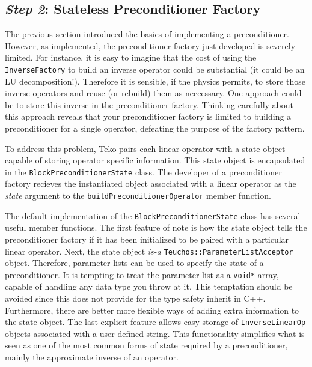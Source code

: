 \documentclass[12pt]{article}
\newcommand{\code}[1]{\lstinline[basicstyle=\footnotesize]!#1!}
\begin{document}
\subsection{\emph{Step 2}: Stateless Preconditioner Factory}
The previous section introduced the basics of implementing a preconditioner. However, as implemented,
the preconditioner factory just developed is severely limited. For instance, it is easy to imagine that
the cost of using the \code{InverseFactory} to build an inverse operator could be substantial (it could
be an LU decomposition!). Therefore it is sensible, if the physics permits, to store those inverse operators
and reuse (or rebuild) them as neccessary. One approach could be to store this inverse in the preconditioner
factory. Thinking carefully about this approach reveals that your preconditioner factory
is limited to building a preconditioner for a single operator, defeating the purpose of the factory pattern. 

To address this problem, Teko pairs each linear operator with a state object capable of storing operator
specific information. This state object is encapsulated in the \code{BlockPreconditionerState} class. The
developer of a preconditioner factory recieves the instantiated object associated with a linear operator 
as the \emph{state} argument to the \code{buildPreconditionerOperator} member function.

The default implementation of the \code{BlockPreconditionerState} class has several useful member functions. 
The first feature of note is how the state object tells the preconditioner factory if it has been
initialized to be paired with a particular linear operator.  Next, the state object \emph{is-a}
\code{Teuchos::ParameterListAcceptor} object.  Therefore, parameter lists can be used to specify the state
of a preconditioner. It is tempting to treat the parameter list as a \code{void*} array, capable of
handling any data type you throw at it. This temptation should be avoided since this does not provide for
the type safety inherit in C++. Furthermore, there are better more flexible ways of adding extra
information to the state object. The last explicit feature allows easy storage of \code{InverseLinearOp}
objects associated with a user defined string. This functionality simplifies what is seen as one of
the most common forms of state required by a preconditioner, mainly the approximate inverse of an operator.
\end{document}
